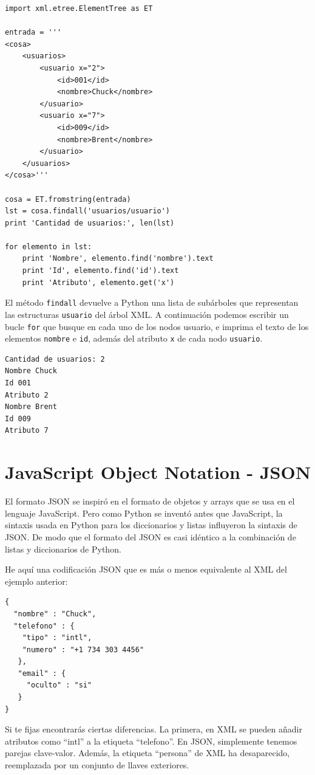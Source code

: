 \beforeverb
\begin{verbatim}
import xml.etree.ElementTree as ET

entrada = '''
<cosa>
    <usuarios>
        <usuario x="2">
            <id>001</id>
            <nombre>Chuck</nombre>
        </usuario>
        <usuario x="7">
            <id>009</id>
            <nombre>Brent</nombre>
        </usuario>
    </usuarios>
</cosa>'''

cosa = ET.fromstring(entrada)
lst = cosa.findall('usuarios/usuario')
print 'Cantidad de usuarios:', len(lst)

for elemento in lst:
    print 'Nombre', elemento.find('nombre').text
    print 'Id', elemento.find('id').text
    print 'Atributo', elemento.get('x')
\end{verbatim}
\afterverb
%
El método {\tt findall} devuelve a Python una lista de subárboles que
representan las estructuras {\tt usuario} del árbol XML. A continuación podemos
escribir un bucle {\tt for} que busque en cada uno de los nodos usuario,
e imprima el texto de los elementos {\tt nombre} e {\tt id}, además del
atributo {\tt x} de cada nodo {\tt usuario}.

\beforeverb
\begin{verbatim}
Cantidad de usuarios: 2
Nombre Chuck
Id 001
Atributo 2
Nombre Brent
Id 009
Atributo 7
\end{verbatim}
\afterverb
%

\section{JavaScript Object Notation - JSON}

El formato JSON se inspiró en el formato de objetos y arrays que se usa en el lenguaje
JavaScript. Pero como Python se inventó antes que JavaScript, la sintaxis usada en Python
para los diccionarios y listas influyeron la sintaxis de JSON. De modo que el formato
del JSON es casi idéntico a la combinación de listas y diccionarios de Python.

He aquí una codificación JSON que es más o menos equivalente al XML del ejemplo anterior:

\beforeverb
\begin{verbatim}
{
  "nombre" : "Chuck",
  "telefono" : {
    "tipo" : "intl",
    "numero" : "+1 734 303 4456"
   },
   "email" : {
     "oculto" : "si"
   }
}
\end{verbatim}
\afterverb
%
Si te fijas encontrarás ciertas diferencias. La primera, en XML se pueden añadir atributos como
``intl'' a la etiqueta ``telefono''. En JSON, simplemente tenemos parejas clave-valor.
Además, la etiqueta ``persona'' de XML ha desaparecido, reemplazada por un conjunto
de llaves exteriores.

